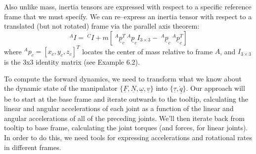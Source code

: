 \documentclass[fleqn]{article}
\begin{document}
Also unlike mass, inertia tensors are expressed with respect to a specific reference frame that we must specify. We can re--express an inertia tensor with respect to a translated (but not rotated) frame via the parallel axis theorem:
\begin{displaymath}
	^{A}I = \ ^{C}I + m\left[\ ^{A}\underline{p}^{T}_{c}\ ^{A}\underline{p}_{c}I_{3\times3} - \ ^{A}\underline{p}_{c}\ ^{A}\underline{p}_{c}^{T}\right]
\end{displaymath}
where $^{A}p_{c} = \left[x_{c}, y_{c}, z_{c}\right]^{T}$ locates the center of mass relative to frame $A$, and $I_{3\times3}$ is the 3x3 identity matrix (see Example 6.2).

To compute the forward dynamics, we need to transform what we know about the dynamic state of the manipulator $\{ \underline{F}, \underline{N}, \underline{\omega}, \underline{v} \}$ into $\{\underline{\tau}, \underline{\dot{q}}\}$. Our approach will be to start at the base frame and iterate outwards to the tooltip, calculating the linear and angular accelerations of each joint as a function of the linear and angular accelerations of all of the preceding joints. We'll then iterate back from tooltip to base frame, calculating the joint torques (and forces, for linear joints). In order to do this, we need tools for expressing accelerations and rotational rates in different frames.
\end{document}
